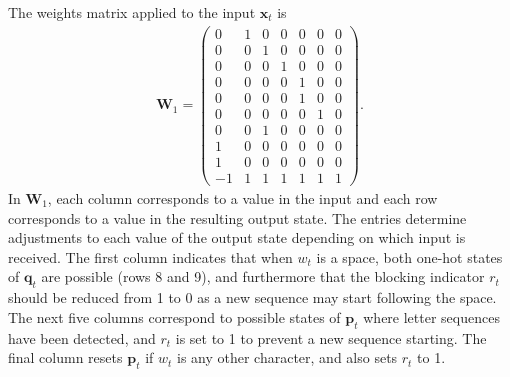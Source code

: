 \documentclass{somasmsc}
\begin{document}
The weights matrix applied to the input $\pmb{x}_t$ is
\begin{align}
\mathbf{W}_1 =
\begin{pmatrix}
 0 & 1 & 0 & 0 & 0 & 0 & 0\\
 0 & 0 & 1 & 0 & 0 & 0 & 0\\
 0 & 0 & 0 & 1 & 0 & 0 & 0\\
 0 & 0 & 0 & 0 & 1 & 0 & 0\\
 0 & 0 & 0 & 0 & 1 & 0 & 0\\
 0 & 0 & 0 & 0 & 0 & 1 & 0\\
 0 & 0 & 1 & 0 & 0 & 0 & 0\\
 1 & 0 & 0 & 0 & 0 & 0 & 0\\
 1 & 0 & 0 & 0 & 0 & 0 & 0\\
-1 & 1 & 1 & 1 & 1 & 1 & 1
\end{pmatrix}.
\end{align}
In $\mathbf{W}_1$, each column corresponds to a value in the input and each row corresponds to a value in the resulting output state. The entries determine adjustments to each value of the output state depending on which input is received. The first column indicates that when $w_t$ is a space, both one-hot states of $\pmb{q}_t$ are possible (rows 8 and 9), and furthermore that the blocking indicator $r_t$ should be reduced from 1 to 0 as a new sequence may start following the space. The next five columns correspond to possible states of $\pmb{p}_t$ where letter sequences have been detected, and $r_t$ is set to 1 to prevent a new sequence starting. The final column resets $\pmb{p}_t$ if $w_t$ is any other character, and also sets $r_t$ to 1.
\end{document}
